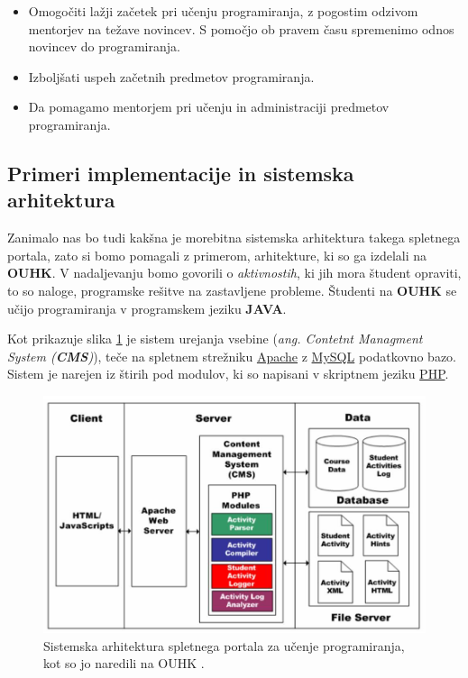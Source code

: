 \begin{itemize}
\item Omogočiti lažji začetek pri učenju programiranja, z pogostim
  odzivom mentorjev na težave novincev. S pomočjo ob pravem času
  spremenimo odnos novincev do programiranja.
\item Izboljšati uspeh začetnih predmetov programiranja.
\item Da pomagamo mentorjem pri učenju in administraciji predmetov
  programiranja.
\end{itemize}

\subsection{Primeri implementacije in sistemska arhitektura}
\label{sec:sistemska_arhitektura_All}

Zanimalo nas bo tudi kakšna je morebitna sistemska arhitektura takega
spletnega portala, zato si bomo pomagali z primerom, arhitekture, ki
so ga izdelali na \textbf{OUHK}.  V nadaljevanju bomo govorili o
\emph{aktivnostih}, ki jih mora študent opraviti, to so naloge,
programske rešitve na zastavljene probleme. Študenti na \textbf{OUHK}
se učijo programiranja v programskem jeziku \textbf{JAVA}.

Kot prikazuje slika \ref{fig:OUHK_cmsArch} je sistem urejanja vsebine
(\emph{ang. Contetnt Managment System (\textbf{CMS})}), teče na
spletnem strežniku \href{http://www.apache.org/}{Apache} z
\href{https://www.mysql.com/}{MySQL} podatkovno bazo. Sistem je
narejen iz štirih pod modulov, ki so napisani v skriptnem jeziku
\href{http://php.net/}{PHP}.

\begin{figure}[htb!] \centering
  \includegraphics[width=0.9\linewidth, keepaspectratio =
1]{./images/SystemArch01_OUHK_DistanceEdu.jpg}
  \caption{Sistemska arhitektura spletnega portala za učenje
    programiranja, kot so jo naredili na OUHK \cite{ITaLCP_DistanceEdu}.}
  \label{fig:OUHK_cmsArch}
\end{figure}

